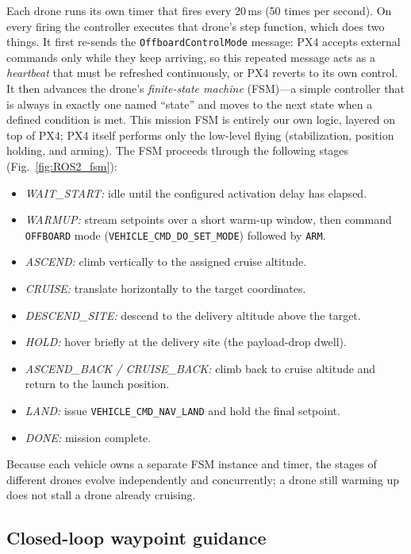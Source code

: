 \documentclass[subscriptcorrection,upint,nolists, varvw,barcolor=Goldenrod3,mathalfa=cal=euler,balance,hyphenate,french]{asmejour} %
\begin{document}
Each drone runs its own timer that fires every 20\,ms (50 times per second). On every firing the controller executes that drone's step function, which does two things. It first re-sends the \texttt{OffboardControlMode} message: PX4 accepts external commands only while they keep arriving, so this repeated message acts as a \emph{heartbeat} that must be refreshed continuously, or PX4 reverts to its own control. It then advances the drone's \emph{finite-state machine} (FSM)---a simple controller that is always in exactly one named ``state'' and moves to the next state when a defined condition is met. This mission FSM is entirely our own logic, layered on top of PX4; PX4 itself performs only the low-level flying (stabilization, position holding, and arming). The FSM proceeds through the following stages (Fig.~\ref{fig:ROS2_fsm}):
\begin{itemize}
  \item \textit{WAIT\_START:} idle until the configured activation delay has elapsed.
  \item \textit{WARMUP:} stream setpoints over a short warm-up window, then command \texttt{OFFBOARD} mode (\texttt{VEHICLE\_CMD\_DO\_SET\_MODE}) followed by \texttt{ARM}.
  \item \textit{ASCEND:} climb vertically to the assigned cruise altitude.
  \item \textit{CRUISE:} translate horizontally to the target coordinates.
  \item \textit{DESCEND\_SITE:} descend to the delivery altitude above the target.
  \item \textit{HOLD:} hover briefly at the delivery site (the payload-drop dwell).
  \item \textit{ASCEND\_BACK / CRUISE\_BACK:} climb back to cruise altitude and return to the launch position.
  \item \textit{LAND:} issue \texttt{VEHICLE\_CMD\_NAV\_LAND} and hold the final setpoint.
  \item \textit{DONE:} mission complete.
\end{itemize}
Because each vehicle owns a separate FSM instance and timer, the stages of different drones evolve independently and concurrently; a drone still warming up does not stall a drone already cruising.

\subsection{Closed-loop waypoint guidance}
\end{document}
